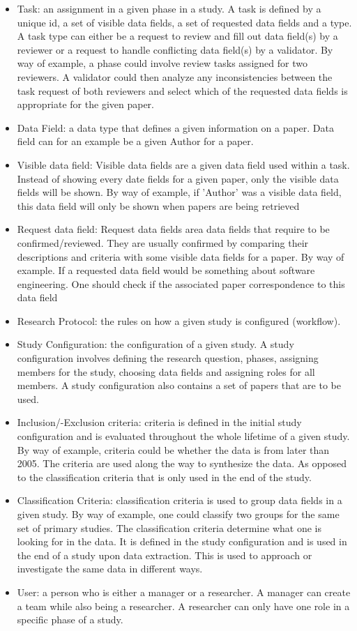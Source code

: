 \begin{itemize}
	\item Task: an assignment in a given phase in a study. A task is defined by a unique id, a set of visible data fields, a set of requested data fields and a type. A task type can either be a request to review and fill out data field(s) by a reviewer or a request to handle conflicting data field(s) by a validator. By way of example, a phase could involve review tasks assigned for two reviewers. A validator could then analyze any inconsistencies between the task request of both reviewers and select which of the requested data fields is appropriate for the given paper.
	\item Data Field: a data type that defines a given information on a paper. Data field can for an example be a given Author for a paper.
	\item Visible data field: Visible data fields are a given data field used within a task. Instead of showing every date fields for a given paper, only the visible data fields will be shown. By way of example, if 'Author' was a visible data field, this data field will only be shown when papers are being retrieved
	\item Request data field: Request data fields area data fields that require to be confirmed/reviewed. They are usually confirmed by comparing their descriptions and criteria with some visible data fields for a paper. By way of example. If a requested data field would be something about software engineering. One should check if the associated paper correspondence to this data field
	\item Research Protocol: the rules on how a given study is configured (workflow).
	\item Study Configuration: the configuration of a given study. A study configuration involves defining the research question, phases, assigning members for the study, choosing data fields and assigning roles for all members. A study configuration also contains a set of papers that are to be used. 
	\item Inclusion/-Exclusion criteria: criteria is defined in the initial study configuration and is evaluated throughout the whole lifetime of a given study. By way of example, criteria could be whether the data is from later than 2005. The criteria are used along the way to synthesize the data. As opposed to the classification criteria that is only used in the end of the study. 
	\item Classification Criteria: classification criteria is used to group data fields in a given study. By way of example, one could classify two groups for the same set of primary studies. The classification criteria determine what one is looking for in the data. It is defined in the study configuration and is used in the end of a study upon data extraction. This is used to approach or investigate the same data in different ways.
	\item User: a person who is either a manager or a researcher. A manager can create a team while also being a researcher. A researcher can only have one role in a specific phase of a study. 
\end{itemize}

